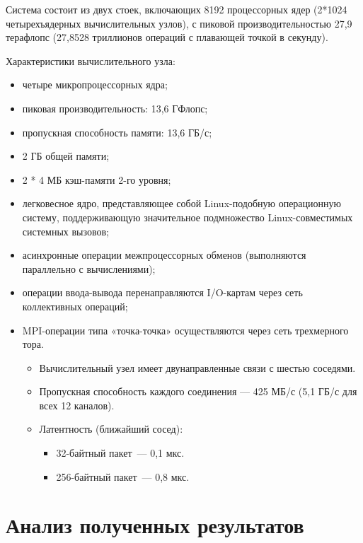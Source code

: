 \documentclass[oneside,final,14pt]{extreport}
\begin{document}
Система состоит из двух стоек, включающих 8192 процессорных ядер
(2*1024 четырехъядерных вычислительных узлов), с пиковой производительностью
27,9 терафлопс (27,8528 триллионов операций с плавающей точкой в секунду).

Характеристики вычислительного узла:

\begin{itemize}
    \item четыре микропроцессорных ядра;
    \item пиковая производительность: 13,6 ГФлопс;
    \item пропускная способность памяти: 13,6 ГБ/с;
    \item 2 ГБ общей памяти;
    \item 2 * 4 МБ кэш-памяти 2-го уровня;
    \item легковесное ядро, представляющее собой Linux-подобную операционную систему,
        поддерживающую значительное подмножество Linux-совместимых системных вызовов;
    \item асинхронные операции межпроцессорных обменов (выполняются параллельно с вычислениями);
    \item операции ввода-вывода перенаправляются I/O-картам через сеть коллективных операций;
    \item MPI-операции типа «точка-точка» осуществляются через сеть трехмерного тора.
        \begin{itemize}
            \item Вычислительный узел имеет двунаправленные связи с шестью соседями.
            \item Пропускная способность каждого соединения — 425 МБ/с (5,1 ГБ/с для всех 12
        каналов).
            \item Латентность (ближайший сосед):
                \begin{itemize}
                    \item 32-байтный пакет~--- 0,1 мкс.
                    \item 256-байтный пакет~--- 0,8 мкс.
                \end{itemize}
        \end{itemize}
\end{itemize}


\chapter*{Анализ полученных результатов}
\end{document}

